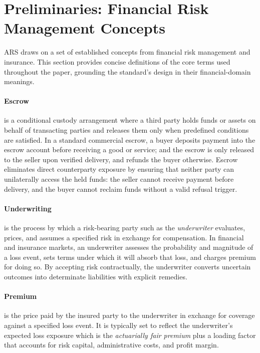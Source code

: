 \documentclass{article} %
\begin{document}
\section{Preliminaries: Financial Risk Management Concepts}



ARS draws on a set of established concepts from financial risk management and insurance. This section provides concise definitions of the core terms used throughout the paper, grounding the standard's design in their financial-domain meanings.

\paragraph{Escrow} is a conditional custody arrangement where a third party holds funds or assets on behalf of transacting parties and releases them only when predefined conditions are satisfied. In a standard commercial escrow, a buyer deposits payment into the escrow account before receiving a good or service; and the escrow is only released to the seller upon verified delivery, and refunds the buyer otherwise. Escrow eliminates direct counterparty exposure by ensuring that neither party can unilaterally access the held funds: the seller cannot receive payment before delivery, and the buyer cannot reclaim funds without a valid refusal trigger. 

\paragraph{Underwriting} is the process by which a risk-bearing party such as the \emph{underwriter} evaluates, prices, and assumes a specified risk in exchange for compensation. In financial and insurance markets, an underwriter assesses the probability and magnitude of a loss event, sets terms under which it will absorb that loss, and charges premium for doing so. By accepting risk contractually, the underwriter converts uncertain outcomes into determinate liabilities with explicit remedies.

\paragraph{Premium} is the price paid by the insured party to the underwriter in exchange for coverage against a specified loss event. It is typically set to reflect the underwriter's expected loss exposure which is the \emph{actuarially fair premium} plus a loading factor that accounts for risk capital, administrative costs, and profit margin. 
\end{document}
